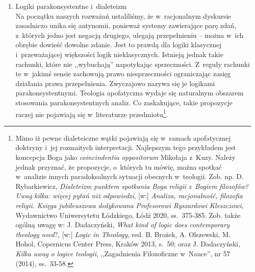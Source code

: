 \begin{enumerate}[label = \arabic*), itemindent=6mm, labelwidth=4mm, labelsep=2mm, itemsep=1em, leftmargin=0mm]
\item Logiki parakonsystentne i~dialeteizm\\
Na początku naszych rozważań ustaliliśmy, że w~racjonalnym dyskursie zasadniczo unika się antynomii, ponieważ systemy zawierające parę zdań, z~których jedno jest negacją drugiego, ulegają przepełnieniu -- można w~ich obrębie dowieść dowolne zdanie. Jest to prawdą dla logiki klasycznej i~przeważającej większości logik nieklasycznych. Istnieją jednak takie rachunki, które nie ,,wybuchają'' napotykając sprzeczności. Z~reguły rachunki te w~jakimś sensie zachowują prawo niesprzeczności ograniczając zasięg działania prawa przepełnienia. Zwyczajowo nazywa się je logikami parakonsystentnymi. Teologia apofatyczna wydaje się naturalnym obszarem stosowania parakonsystentnych analiz. Co zaskakujące, takie propozycje raczej nie pojawiają się w~literaturze przedmiotu\footnote{Mimo iż pewne dialeteiczne wątki pojawiają się w~ramach apofatycznej doktryny i~jej rozmaitych interpretacji. Najlepszym tego przykładem jest koncepcja Boga jako \textit{coincindentia oppositorum} Mikołaja z~Kuzy. Należy jednak przyznać, że propozycje, o~których tu mówię, można spotkać w~analizie innych paradoksalnych sytuacji obecnych w~teologii. Zob. np. D. Rybarkiewicz, \textit{Dialeteizm punktem spotkania Boga religii z~Bogiem filozofów? Uwag kilka: więcej pytań niż odpowiedzi}, [w:] \textit{Analiza, racjonalność, filozofia religii. Księga jubileuszowa dedykowana Profesorowi Ryszardowi Kleszczowi}, Wydawnictwo Uniwersytetu Łódzkiego, Łódź 2020, ss.~375-385. Zob. także ogólną uwagę w: J. Dadaczyński, \textit{What kind of logic does contemporary theology need}?, [w:] \textit{Logic in Theology}, red. B. Brożek, A. Olszewski, M. Hohol, Copernicus Center Press, Kraków 2013, s.~50; oraz J. Dadaczyński, \textit{Kilka uwag o logice teologii}, ,,Zagadnienia Filozoficzne w~Nauce'', nr 57 (2014), ss.~33-58.}.


\end{enumerate}
